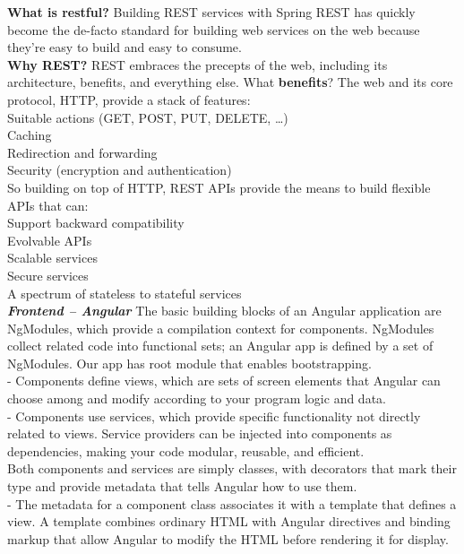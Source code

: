 \documentclass{scrartcl}
\begin{document}
\textbf{What is restful?}
Building REST services with Spring
REST has quickly become the de-facto standard for building web services on the web because they’re easy to build and easy to consume.\\
\textbf{Why REST?} REST embraces the precepts of the web, including its architecture, benefits, and everything else.
What \textbf{benefits}? The web and its core protocol, HTTP, provide a stack of features:\\
Suitable actions (GET, POST, PUT, DELETE, …​)\\
Caching\\
Redirection and forwarding\\
Security (encryption and authentication)\\

So building on top of HTTP, REST APIs provide the means to build flexible APIs that can:\\
Support backward compatibility\\
Evolvable APIs\\

Scalable services\\

Secure services\\

A spectrum of stateless to stateful services\\


\textbf{\textit{Frontend – Angular }}
The basic building blocks of an Angular application are NgModules, which provide a compilation context for components. NgModules collect related code into functional sets; an Angular app is defined by a set of NgModules. Our app has  root module that enables bootstrapping.\\

 - Components define views, which are sets of screen elements that Angular can choose among and modify according to your program logic and data.\\

 - Components use services, which provide specific functionality not directly related to views. Service providers can be injected into components as dependencies, making your code modular, reusable, and efficient.\\

Both components and services are simply classes, with decorators that mark their type and provide metadata that tells Angular how to use them.\\

 - The metadata for a component class associates it with a template that defines a view. A template combines ordinary HTML with Angular directives and binding markup that allow Angular to modify the HTML before rendering it for display.\\
\end{document}
